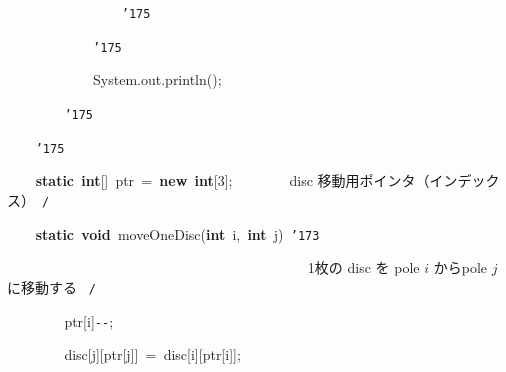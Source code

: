 \documentclass[a4paper,10pt]{article}
\def\mc{\relax}
\begin{document}
\noindent
\mbox{}{\tt\mc \ }{\tt\mc \ }{\tt\mc \ }{\tt\mc \ }{\tt\mc \ }{\tt\mc \ }{\tt\mc \ }{\tt\mc \ }{\tt\mc \ }{\tt\mc \ }{\tt\mc \ }{\tt\mc \ }{\tt\mc \ }{\tt\mc \ }{\tt\mc \ }{\tt\mc \ }{\tt\char'175}

\noindent
\mbox{}{\tt\mc \ }{\tt\mc \ }{\tt\mc \ }{\tt\mc \ }{\tt\mc \ }{\tt\mc \ }{\tt\mc \ }{\tt\mc \ }{\tt\mc \ }{\tt\mc \ }{\tt\mc \ }{\tt\mc \ }{\tt\char'175}

\noindent
\mbox{}{\tt\mc \ }{\tt\mc \ }{\tt\mc \ }{\tt\mc \ }{\tt\mc \ }{\tt\mc \ }{\tt\mc \ }{\tt\mc \ }{\tt\mc \ }{\tt\mc \ }{\tt\mc \ }{\tt\mc \ }System.out.println();

\noindent
\mbox{}{\tt\mc \ }{\tt\mc \ }{\tt\mc \ }{\tt\mc \ }{\tt\mc \ }{\tt\mc \ }{\tt\mc \ }{\tt\mc \ }{\tt\char'175}

\noindent
\mbox{}{\tt\mc \ }{\tt\mc \ }{\tt\mc \ }{\tt\mc \ }{\tt\char'175}

\noindent
\mbox{}\hfill

\noindent
\mbox{}{\tt\mc \ }{\tt\mc \ }{\tt\mc \ }{\tt\mc \ }\textbf{static}{\tt\mc \ }\textbf{int}[]{\tt\mc \ }ptr{\tt\mc \ }={\tt\mc \ }\textbf{new}{\tt\mc \ }\textbf{int}[3];{\tt\mc \ }{\tt\mc \ }{\tt\mc \ }{\tt\mc \ }{\tt\mc \ }{\tt\mc \ }\rm\mc {\tt /}{\tt *}\  \ disc 移動用ポインタ（インデックス）\hfill \rm\mc \ {\tt *}{\tt /}
\tt\mc 

\noindent
\mbox{}\hfill

\noindent
\mbox{}{\tt\mc \ }{\tt\mc \ }{\tt\mc \ }{\tt\mc \ }\textbf{static}{\tt\mc \ }\textbf{void}{\tt\mc \ }moveOneDisc(\textbf{int}{\tt\mc \ }i,{\tt\mc \ }\textbf{int}{\tt\mc \ }j){\tt\mc \ }{\tt\char'173}

\noindent
\mbox{}{\tt\mc \ }{\tt\mc \ }{\tt\mc \ }{\tt\mc \ }{\tt\mc \ }{\tt\mc \ }{\tt\mc \ }{\tt\mc \ }{\tt\mc \ }{\tt\mc \ }{\tt\mc \ }{\tt\mc \ }{\tt\mc \ }{\tt\mc \ }{\tt\mc \ }{\tt\mc \ }{\tt\mc \ }{\tt\mc \ }{\tt\mc \ }{\tt\mc \ }{\tt\mc \ }{\tt\mc \ }{\tt\mc \ }{\tt\mc \ }{\tt\mc \ }{\tt\mc \ }{\tt\mc \ }{\tt\mc \ }{\tt\mc \ }{\tt\mc \ }{\tt\mc \ }{\tt\mc \ }{\tt\mc \ }{\tt\mc \ }{\tt\mc \ }{\tt\mc \ }{\tt\mc \ }{\tt\mc \ }{\tt\mc \ }{\tt\mc \ }\rm\mc {\tt /}{\tt *}\  \ 1枚の disc を pole $i$ からpole $j$ に移動する \hfill \rm\mc \ {\tt *}{\tt /}
\tt\mc 

\noindent
\mbox{}{\tt\mc \ }{\tt\mc \ }{\tt\mc \ }{\tt\mc \ }{\tt\mc \ }{\tt\mc \ }{\tt\mc \ }{\tt\mc \ }ptr[i]{\tt -}{\tt -};

\noindent
\mbox{}{\tt\mc \ }{\tt\mc \ }{\tt\mc \ }{\tt\mc \ }{\tt\mc \ }{\tt\mc \ }{\tt\mc \ }{\tt\mc \ }disc[j][ptr[j]]{\tt\mc \ }={\tt\mc \ }disc[i][ptr[i]];
\end{document}
